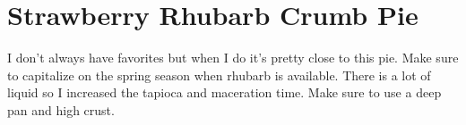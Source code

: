 \section[Strawberry Rhubarb Pie]{
    Strawberry Rhubarb Crumb Pie
}

\begin{recipestats}[
        servings=1 pie,
        preptime=1 \onehalf~\hour,
        bakingtime=50 \minute,
        source=\citefield{pie2004}{title}~\cite{pie2004},
    ]
\end{recipestats}

\begin{recipeabstract}
    I don't always have favorites but when I do it's pretty close to this pie.
    Make sure to capitalize on the spring season when rhubarb is available.
    There is a lot of liquid so I increased the tapioca and maceration time.
    Make sure to use a deep pan and high crust.
\end{recipeabstract}

\begin{ingredientcolumns}
    \begin{ingredientblock}[filling]
        \\
        \\
        \\
        \\
        \\
    \end{ingredientblock}
    \begin{ingredientblock}[topping]
        \\
        \\
        \\
        \\
        \\
    \end{ingredientblock}
\end{ingredientcolumns}

